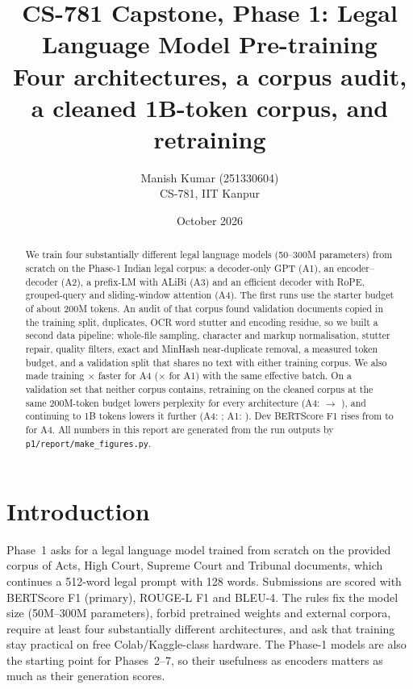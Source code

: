 \documentclass[11pt,a4paper]{article}
\title{\textbf{CS-781 Capstone, Phase 1: Legal Language Model Pre-training}\\[2pt]
\large Four architectures, a corpus audit, a cleaned 1B-token corpus, and retraining}
\author{Manish Kumar (251330604)\\ CS-781, IIT Kanpur}
\date{October 2026}
\newcommand{\code}[1]{\texttt{\small #1}}
\begin{document}
\maketitle

\begin{abstract}
\noindent We train four substantially different legal language models (50--300M parameters) from scratch on
the Phase-1 Indian legal corpus: a decoder-only GPT (A1), an encoder--decoder (A2), a prefix-LM with ALiBi
(A3) and an efficient decoder with RoPE, grouped-query and sliding-window attention (A4).  The first runs use
the starter budget of about 200M tokens.  An audit of that corpus found validation documents copied in the
training split, duplicates, OCR word stutter and encoding residue, so we built a second data pipeline:
whole-file sampling, character and markup normalisation, stutter repair, quality filters, exact and MinHash
near-duplicate removal, a measured token budget, and a validation split that shares no text with either
training corpus.  We also made training \speedupAfour$\times$ faster for A4 (\speedupAone$\times$ for A1) with
the same effective batch.  On a validation set that neither corpus contains, retraining on the cleaned
corpus at the same 200M-token budget lowers perplexity for every architecture (A4: \fairRzeroAfour{} $\to$
\fairRoneAfour), and continuing to 1B tokens lowers it further (A4: \fairRtwoAfour; A1: \fairRtwoAone).
Dev BERTScore F1 rises from \bertRzeroAfour{} to \bertRtwoAfour{} for A4.  All numbers in this report are
generated from the run outputs by \code{p1/report/make\_figures.py}.
\end{abstract}

\tableofcontents
\newpage

\section{Introduction}
Phase~1 asks for a legal language model trained from scratch on the provided corpus of Acts, High Court,
Supreme Court and Tribunal documents, which continues a 512-word legal prompt with 128 words.  Submissions
are scored with BERTScore F1 (primary), ROUGE-L F1 and BLEU-4.  The rules fix the model size (50M--300M
parameters), forbid pretrained weights and external corpora, require at least four substantially
different architectures, and ask that training stay practical on free Colab/Kaggle-class hardware.  The
Phase-1 models are also the starting point for Phases~2--7, so their usefulness as encoders matters as much
as their generation scores.
\end{document}
